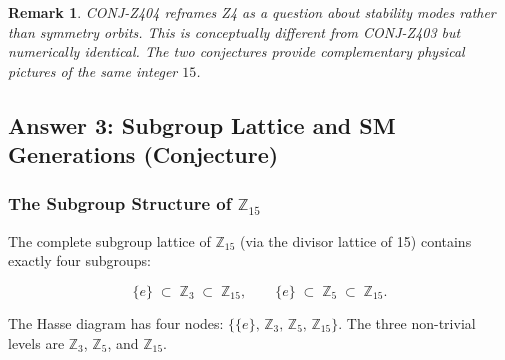 \documentclass[12pt, a4paper]{article}
\newtheorem{remark}{Remark}[section]
\begin{document}
\begin{remark}
CONJ-Z404 reframes Z4 as a question about \emph{stability modes}
rather than \emph{symmetry orbits}. This is conceptually
different from CONJ-Z403 but numerically identical.
The two conjectures provide complementary physical pictures
of the same integer $15$.
\end{remark}

\subsection{Answer 3: Subgroup Lattice and SM Generations (Conjecture)}
\label{sec:generations}

\subsubsection{The Subgroup Structure of $\mathbb{Z}_{15}$}

The complete subgroup lattice of $\mathbb{Z}_{15}$ (via the
divisor lattice of 15) contains exactly four subgroups:

\begin{equation}
  \{e\} \;\subset\; \mathbb{Z}_3 \;\subset\; \mathbb{Z}_{15},
  \qquad
  \{e\} \;\subset\; \mathbb{Z}_5 \;\subset\; \mathbb{Z}_{15}.
\end{equation}

The Hasse diagram has four nodes:
$\{\{e\},\, \mathbb{Z}_3,\, \mathbb{Z}_5,\, \mathbb{Z}_{15}\}$.
The three non-trivial levels are $\mathbb{Z}_3$, $\mathbb{Z}_5$,
and $\mathbb{Z}_{15}$.
\end{document}
